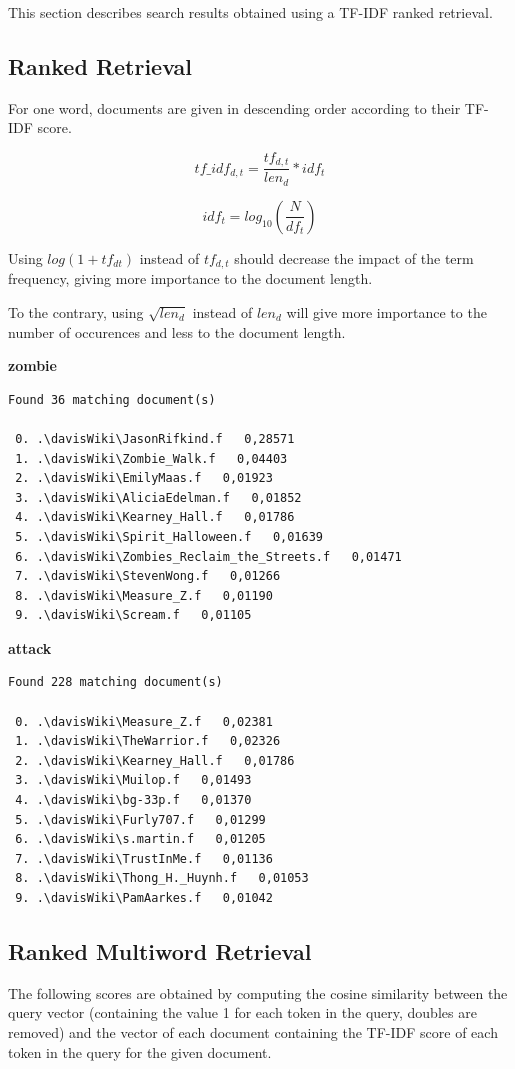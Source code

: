 \setcounter{section}{2}
This section describes search results obtained using a TF-IDF ranked retrieval.

\subsection{Ranked Retrieval}
For one word, documents are given in descending order according to their TF-IDF score.

\begin{equation}
tf\_idf_{d,t} = \frac{tf_{d,t}}{len_d} * idf_t
\end{equation}

\begin{equation}
idf_t = log_{10}(\frac{N}{df_t})
\end{equation}

Using $log(1+tf_{dt})$ instead of $tf_{d,t}$ should decrease the impact of the term frequency, giving more importance to the document length.

To the contrary, using $\sqrt{len_d}$ instead of $len_d$ will give more importance to the number of occurences and less to the document length.

\textbf{zombie}\\
\begin{verbatim}
Found 36 matching document(s)

 0. .\davisWiki\JasonRifkind.f   0,28571
 1. .\davisWiki\Zombie_Walk.f   0,04403
 2. .\davisWiki\EmilyMaas.f   0,01923
 3. .\davisWiki\AliciaEdelman.f   0,01852
 4. .\davisWiki\Kearney_Hall.f   0,01786
 5. .\davisWiki\Spirit_Halloween.f   0,01639
 6. .\davisWiki\Zombies_Reclaim_the_Streets.f   0,01471
 7. .\davisWiki\StevenWong.f   0,01266
 8. .\davisWiki\Measure_Z.f   0,01190
 9. .\davisWiki\Scream.f   0,01105
\end{verbatim}

\textbf{attack}\\
\begin{verbatim}
Found 228 matching document(s)

 0. .\davisWiki\Measure_Z.f   0,02381
 1. .\davisWiki\TheWarrior.f   0,02326
 2. .\davisWiki\Kearney_Hall.f   0,01786
 3. .\davisWiki\Muilop.f   0,01493
 4. .\davisWiki\bg-33p.f   0,01370
 5. .\davisWiki\Furly707.f   0,01299
 6. .\davisWiki\s.martin.f   0,01205
 7. .\davisWiki\TrustInMe.f   0,01136
 8. .\davisWiki\Thong_H._Huynh.f   0,01053
 9. .\davisWiki\PamAarkes.f   0,01042
\end{verbatim}

\subsection{Ranked Multiword Retrieval}
The following scores are obtained by computing the cosine similarity between the query vector (containing the value 1 for each token in the query, doubles are removed) and the vector of each document containing the TF-IDF score of each token in the query for the given document.

